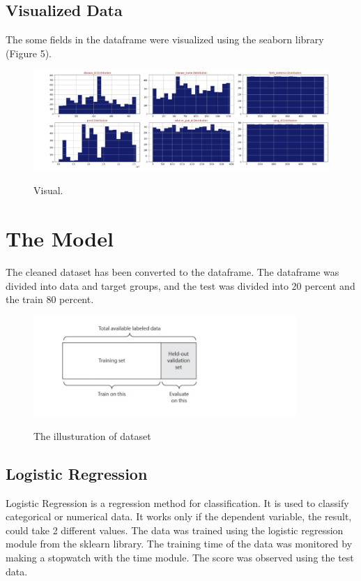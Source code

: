 \documentclass[onecolumn]{article}
\begin{document}
\subsection{Visualized Data}
The some fields in the dataframe were visualized using the seaborn library (Figure 5).

\begin{figure}[h!t]
\centering
{\centering
    \includegraphics[width=14.1cm]{fig/visual.png}}        
\caption{Visual.}
\end{figure}



\section{The Model}

The cleaned dataset has been converted to the dataframe. The dataframe was divided into data and target groups, and the test was divided into 20 percent and the train 80 percent.

\begin{figure}[h!t]
\centering
{\centering
    \includegraphics[width=10cm]{fig/model.png}}        
\caption{The illusturation of dataset }
\end{figure}



\subsection{Logistic Regression}
Logistic Regression is a regression method for classification. It is used to classify categorical or numerical data. It works only if the dependent variable, the result, could take 2 different values.
The data was trained using the logistic regression module from the sklearn library.
The training time of the data was monitored by making a stopwatch with the time module.
The score was observed using the test data.
\end{document}
